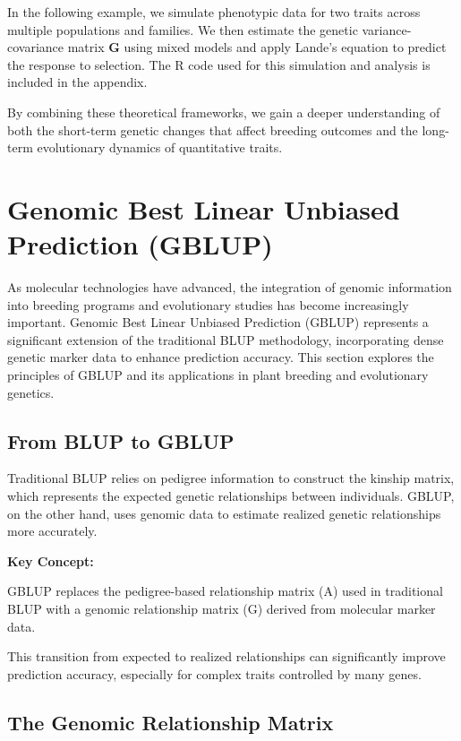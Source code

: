 \documentclass[12pt,a4paper]{article}
\newenvironment{keyconceptbox}[1][]
{\begin{basebox}[linecolor=uqblue]
\textbf{\color{uqblue}Key Concept:} \textit{#1}\par\noindent\ignorespaces}
{\end{basebox}}
\begin{document}
In the following example, we simulate phenotypic data for two traits across multiple populations and families. We then estimate the genetic variance-covariance matrix \( \mathbf{G} \) using mixed models and apply Lande’s equation to predict the response to selection. The R code used for this simulation and analysis is included in the appendix.

By combining these theoretical frameworks, we gain a deeper understanding of both the short-term genetic changes that affect breeding outcomes and the long-term evolutionary dynamics of quantitative traits.


\section{Genomic Best Linear Unbiased Prediction (GBLUP)}

As molecular technologies have advanced, the integration of genomic information into breeding programs and evolutionary studies has become increasingly important. Genomic Best Linear Unbiased Prediction (GBLUP) represents a significant extension of the traditional BLUP methodology, incorporating dense genetic marker data to enhance prediction accuracy. This section explores the principles of GBLUP and its applications in plant breeding and evolutionary genetics.

\subsection{From BLUP to GBLUP}

Traditional BLUP relies on pedigree information to construct the kinship matrix, which represents the expected genetic relationships between individuals. GBLUP, on the other hand, uses genomic data to estimate realized genetic relationships more accurately.

\begin{keyconceptbox}
    GBLUP replaces the pedigree-based relationship matrix (A) used in traditional BLUP with a genomic relationship matrix (G) derived from molecular marker data.

\end{keyconceptbox}

This transition from expected to realized relationships can significantly improve prediction accuracy, especially for complex traits controlled by many genes.

\subsection{The Genomic Relationship Matrix}
\end{document}
